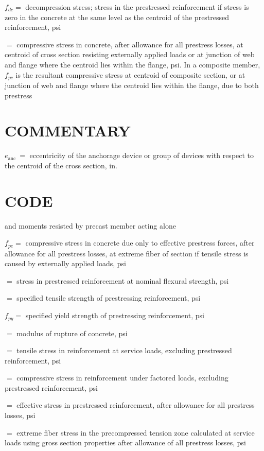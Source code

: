 \documentclass[10pt]{article}
\begin{document}
$f_{d c}=$ decompression stress; stress in the prestressed reinforcement if stress is zero in the concrete at the same level as the centroid of the prestressed reinforcement, psi

$=$ compressive stress in concrete, after allowance for all prestress losses, at centroid of cross section resisting externally applied loads or at junction of web and flange where the centroid lies within the flange, psi. In a composite member, $f_{p c}$ is the resultant compressive stress at centroid of composite section, or at junction of web and flange where the centroid lies within the flange, due to both prestress

\section*{COMMENTARY}
$e_{\text {anc }}=$ eccentricity of the anchorage device or group of devices with respect to the centroid of the cross section, in.

\section*{CODE}
and moments resisted by precast member acting alone

$f_{p e}=$ compressive stress in concrete due only to effective prestress forces, after allowance for all prestress losses, at extreme fiber of section if tensile stress is caused by externally applied loads, psi

$=$ stress in prestressed reinforcement at nominal flexural strength, psi

$=$ specified tensile strength of prestressing reinforcement, psi

$f_{p y}=$ specified yield strength of prestressing reinforcement, psi

$=$ modulus of rupture of concrete, psi

$=$ tensile stress in reinforcement at service loads, excluding prestressed reinforcement, psi

$=$ compressive stress in reinforcement under factored loads, excluding prestressed reinforcement, psi

$=$ effective stress in prestressed reinforcement, after allowance for all prestress losses, psi

$=$ extreme fiber stress in the precompressed tension zone calculated at service loads using gross section properties after allowance of all prestress losses, psi
\end{document}
